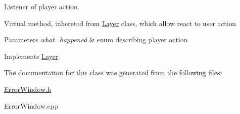 Listener of player action. 

Virtual method, inhereted from \hyperlink{class_layer}{Layer} class, which allow react to user action 
\begin{DoxyParams}{Parameters}
{\em what\+\_\+happened} & enum describing player action \\
\hline
\end{DoxyParams}


Implements \hyperlink{class_layer}{Layer}.



The documentation for this class was generated from the following files\+:\begin{DoxyCompactItemize}
\item 
\hyperlink{_error_window_8h}{Error\+Window.\+h}\item 
Error\+Window.\+cpp\end{DoxyCompactItemize}
